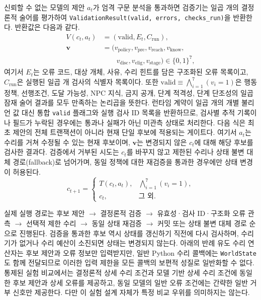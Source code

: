 \documentclass[journal]{IEEEtran}
\begin{document}
신뢰할 수 없는 모델의 제안 $a_t$가 엄격 구문 분석을 통과하면 검증기는 일곱 개의 결정론적 술어를 평가하여 \texttt{ValidationResult(valid, errors, checks\_run)}을 반환한다. 반환값은 다음과 같다.
\begin{equation}
\begin{aligned}
V(c_t,a_t)&=(\mathrm{valid},E_t,C_{\mathrm{run}}),\\
\boldsymbol{v}&=(v_{\mathrm{policy}},v_{\mathrm{pre}},v_{\mathrm{reach}},v_{\mathrm{know}},\\
&\qquad v_{\mathrm{disc}},v_{\mathrm{elig}},v_{\mathrm{stage}})\in\{0,1\}^{7},
\end{aligned}
\end{equation}
여기서 $E_t$는 오류 코드, 대상 개체, 사유, 수리 힌트를 담은 구조화된 오류 목록이고, $C_{\mathrm{run}}$은 실행된 일곱 개 검사의 식별자 목록이다. 또한 $\mathrm{valid}\equiv\bigwedge_{i=1}^{7}(v_i=1)$은 행동 정책, 선행조건, 도달 가능성, NPC 지식, 금지 공개, 단계 적격성, 단계 단조성의 일곱 잠재 술어 결과를 모두 만족하는 논리곱을 뜻한다. 런타임 계약이 일곱 개의 개별 불리언 값 대신 통합 \texttt{valid} 플래그와 실행 검사 ID 목록을 반환하므로, 검사별 추적 기록이나 필드가 누락된 경우에는 통과나 실패가 아닌 미관측 상태로 처리한다. 다음 식은 최초 제안의 전체 트랜잭션이 아니라 현재 단일 후보에 적용되는 게이트다. 여기서 $a_t$는 수리를 거쳐 수정될 수 있는 현재 후보이며, $\boldsymbol{v}$는 변경되지 않은 $c_t$에 대해 해당 후보를 검사한 결과다. 검증에서 거부된 시도는 $c_t$를 바꾸지 않고 제한된 수리나 상태 불변 대체 경로(fallback)로 넘어가며, 동일 정책에 대한 재검증을 통과한 경우에만 상태 변경이 허용된다.
\begin{equation}
c_{t+1}=\begin{cases}
T(c_t,a_t), & \bigwedge_{i=1}^{7}(v_i=1),\\
c_t, & \text{그 외.}
\end{cases}
\label{eq:transition}
\end{equation}

실제 실행 경로는 후보 제안 $\rightarrow$ 결정론적 검증 $\rightarrow$ 유효성·검사 ID·구조화 오류 관측 $\rightarrow$ 선택적 제한 수리 $\rightarrow$ 동일 상태 재검증 $\rightarrow$ 커밋 또는 상태 불변 대체 경로 순으로 진행된다. 검증을 통과한 후보 역시 상태를 갱신하기 직전에 다시 검사하며, 수리기가 없거나 수리 예산이 소진되면 상태는 변경되지 않는다. 아래의 반례 유도 수리 연산자는 후보 제안과 오류 정보만 입력받지만, 일반 Python 수리 콜백에는 \texttt{WorldState}도 함께 전달되므로 이러한 입력 제한을 모든 콜백의 보편적 성질로 일반화할 수 없다. 통제된 실험 비교에서는 결정론적 상세 수리 조건과 모델 기반 상세 수리 조건에 동일한 후보 제안과 상세 오류를 제공하고, 동일 모델의 일반 오류 조건에는 간략한 일반 거부 신호만 제공한다. 다만 이 실험 설계 자체가 특정 비교 우위를 의미하지는 않는다.
\end{document}
